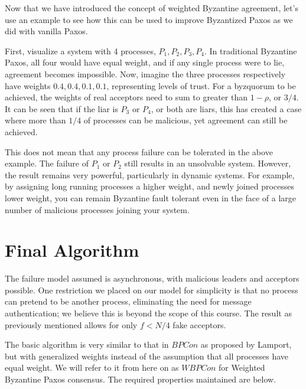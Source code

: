 \documentclass[conference]{IEEEtran}
\begin{document}
Now that we have introduced the concept of weighted Byzantine agreement, let's use an example to see how this can be used to improve Byzantized Paxos as we did with vanilla Paxos.

First, visualize a system with 4 processes, ${P_1, P_2, P_3, P_4}$. In traditional Byzantine Paxos, all four would have equal weight, and if any single process were to lie, agreement becomes impossible. Now, imagine the three processes respectively have weights ${0.4, 0.4, 0.1, 0.1}$, representing levels of trust. For a byzquorum to be achieved, the weights of real acceptors need to sum to greater than $1 - \rho$, or $3/4$. It can be seen that if the liar is $P_3$ or $P_4$, or both are liars, this has created a case where more than $1/4$ of processes can be malicious, yet agreement can still be achieved. 

This does not mean that any process failure can be tolerated in the above example. The failure of $P_1$ or $P_2$ still results in an unsolvable system. However, the result remains very powerful, particularly in dynamic systems. For example, by assigning long running processes a higher weight, and newly joined processes lower weight, you can remain Byzantine fault tolerant even in the face of a large number of malicious processes joining your system.

\section{Final Algorithm}
The failure model assumed is asynchronous, with malicious leaders and acceptors possible. One restriction we placed on our model for simplicity is that no process can pretend to be another process, eliminating the need for message authentication; we believe this is beyond the scope of this course. The result as previously mentioned allows for only $f < N/4$ fake acceptors.

The basic algorithm is very similar to that in $BPCon$ as proposed by Lamport, but with generalized weights instead of the assumption that all processes have equal weight. We will refer to it from here on as $WBPCon$ for Weighted Byzantine Paxos consensus. The required properties maintained are below.
\end{document}
